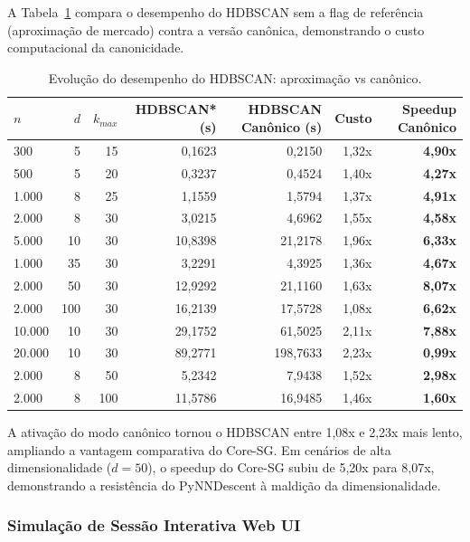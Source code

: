 \documentclass[12pt,a4paper,oneside]{article}
\begin{document}
A Tabela~\ref{tab:evolucao_hdbscan} compara o desempenho do HDBSCAN sem a flag de referência
(aproximação de mercado) contra a versão canônica, demonstrando o custo computacional da
canonicidade.

\begin{table}[htbp]
  \centering
  \caption{Evolução do desempenho do HDBSCAN: aproximação vs canônico.}
  \label{tab:evolucao_hdbscan}
  \begin{tabular}{lrrrrrr}
    \toprule
    \textbf{$n$} & \textbf{$d$} & \textbf{$k_{max}$} &
    \textbf{HDBSCAN* (s)} & \textbf{HDBSCAN Canônico (s)} &
    \textbf{Custo} & \textbf{Speedup Canônico} \\
    \midrule
    300 & 5 & 15 & 0,1623 & 0,2150 & 1,32x & \textbf{4,90x} \\
    500 & 5 & 20 & 0,3237 & 0,4524 & 1,40x & \textbf{4,27x} \\
    1.000 & 8 & 25 & 1,1559 & 1,5794 & 1,37x & \textbf{4,91x} \\
    2.000 & 8 & 30 & 3,0215 & 4,6962 & 1,55x & \textbf{4,58x} \\
    5.000 & 10 & 30 & 10,8398 & 21,2178 & 1,96x & \textbf{6,33x} \\
    1.000 & 35 & 30 & 3,2291 & 4,3925 & 1,36x & \textbf{4,67x} \\
    2.000 & 50 & 30 & 12,9292 & 21,1160 & 1,63x & \textbf{8,07x} \\
    2.000 & 100 & 30 & 16,2139 & 17,5728 & 1,08x & \textbf{6,62x} \\
    10.000 & 10 & 30 & 29,1752 & 61,5025 & 2,11x & \textbf{7,88x} \\
    20.000 & 10 & 30 & 89,2771 & 198,7633 & 2,23x & \textbf{0,99x} \\
    2.000 & 8 & 50 & 5,2342 & 7,9438 & 1,52x & \textbf{2,98x} \\
    2.000 & 8 & 100 & 11,5786 & 16,9485 & 1,46x & \textbf{1,60x} \\
    \bottomrule
  \end{tabular}
\end{table}

A ativação do modo canônico tornou o HDBSCAN entre 1,08x e 2,23x mais lento, ampliando a
vantagem comparativa do Core-SG. Em cenários de alta dimensionalidade ($d=50$), o speedup do
Core-SG subiu de 5,20x para 8,07x, demonstrando a resistência do PyNNDescent à maldição da
dimensionalidade.

\subsubsection{Simulação de Sessão Interativa Web UI}
\end{document}
